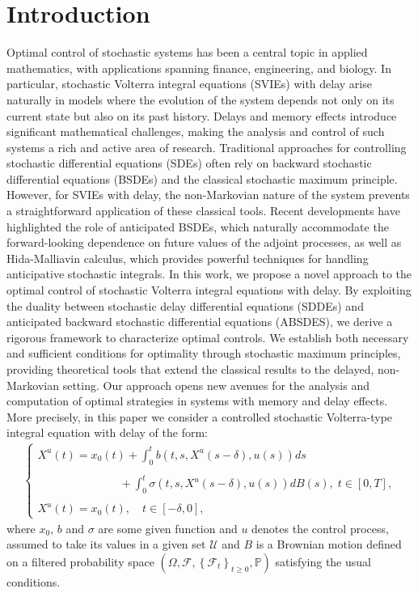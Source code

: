 \documentclass[12pt]{article}
\theoremstyle{remark}
\numberwithin{equation}{section}
\begin{document}
\section{Introduction}
Optimal control of stochastic systems has been a central topic in applied mathematics, with applications spanning finance, engineering, and biology. In particular, stochastic Volterra integral equations (SVIEs) with delay arise naturally in models where the evolution of the system depends not only on its current state but also on its past history. Delays and memory effects introduce significant mathematical challenges, making the analysis and control of such systems a rich and active area of research.
Traditional approaches for controlling stochastic differential equations (SDEs) often rely on backward stochastic differential equations (BSDEs) and the classical stochastic maximum principle. However, for SVIEs with delay, the non-Markovian nature of the system prevents a straightforward application of these classical tools. Recent developments have highlighted the role of anticipated BSDEs, which naturally accommodate the forward-looking dependence on future values of the adjoint processes, as well as Hida-Malliavin calculus, which provides powerful techniques for handling anticipative stochastic integrals.
In this work, we propose a novel approach to the optimal control of stochastic Volterra integral equations with delay. By exploiting the duality between stochastic delay differential equations (SDDEs) and anticipated backward stochastic differential equations (ABSDES), we derive a rigorous framework to characterize optimal controls. We establish both necessary and sufficient conditions for optimality through stochastic maximum principles, providing theoretical tools that extend the classical results to the delayed, non-Markovian setting. Our approach opens new avenues for the analysis and computation of optimal strategies in systems with memory and delay effects.
More precisely, in this paper we consider a controlled stochastic Volterra-type integral equation with delay of the form:
\begin{eqnarray}\label{ee1}
\left\{
\begin{array}{l}
\displaystyle X^{u}(t)= x_{0}(t)+ \int_{0}^{t}b(t,s,X^{u}(s-\delta),u(s)) ds\\\\\;\;\;\;\;\;\;\;\;\;\;\;\;\;\;\;\;\;\;\;\;\;\;\;\;\; +\displaystyle\int_{0}^{t} \sigma(t,s,X^{u}(s-\delta),u(s))dB(s), \; 	t \in [0,T],\\\\
X^{u}(t) = x_{0}(t), \quad t \in [-\delta, 0],
\end{array}\right.
\end{eqnarray}
where $x_{0},\,b$ and $\sigma$ are some given function and $u$ denotes the control process, assumed to take its values in a given set $\mathcal{U}$ and $B$ is a Brownian motion defined on a filtered probability space $\left( \Omega, \mathcal{F},  \left\lbrace \mathcal{F}_{t} \right\rbrace_{t \geqslant 0}, \mathbb{P} \right)$ satisfying the usual conditions. 
\end{document}
